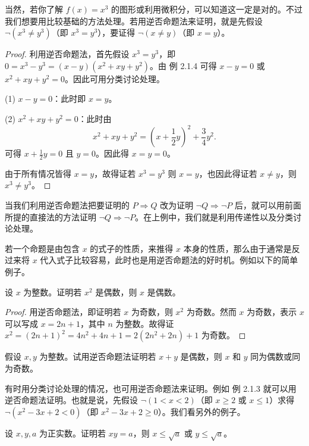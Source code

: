 当然，若你了解 $f(x) = x^3$ 的图形或利用微积分，可以知道这一定是对的。不过我们想要用比较基础的方法处理。若用逆否命题法来证明，就是先假设 $\neg (x^3 \neq y^3)$（即 $x^3 = y^3$），要证得 $\neg (x \neq y)$（即 $x = y$）。

\begin{proof}
利用逆否命题法，首先假设 $x^3 = y^3$，即 $0 = x^3 - y^3 = (x - y)(x^2 + xy + y^2)$。由 例 2.1.4 可得 $x - y = 0$ 或 $x^2 + xy + y^2 = 0$。因此可用分类讨论处理。

(1) $x - y = 0$：此时即 $x = y$。

(2) $x^2 + xy + y^2 = 0$：此时由
$$x^2 + xy + y^2 = (x + \frac{1}{2}y)^2 + \frac{3}{4}y^2.$$
可得 $x + \frac{1}{2} y = 0$ 且 $y = 0$。因此得 $x = y = 0$。

由于所有情况皆得 $x = y$，故得证若 $x^3 = y^3$ 则 $x = y$，也因此得证若 $x \neq y$，则 $x^3 \neq y^3$。
\end{proof}

当我们利用逆否命题法把要证明的 $P \Rightarrow Q$ 改为证明 $\neg Q \Rightarrow \neg P$ 后，就可以用前面所提的直接法的方法证明 $\neg Q \Rightarrow \neg P$。在上例中，我们就是利用传递性以及分类讨论处理。

若一个命题是由包含 $x$ 的式子的性质，来推得 $x$ 本身的性质，那么由于通常是反过来将 $x$ 代入式子比较容易，此时也是用逆否命题法的好时机。例如以下的简单例子。

\begin{example}
设 $x$ 为整数。证明若 $x^2$ 是偶数，则 $x$ 是偶数。
\end{example}

\begin{proof}
用逆否命题法，即证明若 $x$ 为奇数，则 $x^2$ 为奇数。然而 $x$ 为奇数，表示 $x$ 可以写成 $x = 2n + 1$，其中 $n$ 为整数。故得证 $x^2 = (2n + 1)^2 = 4n^2 + 4n + 1 = 2(2n^2 + 2n) + 1$ 为奇数。
\end{proof}

\begin{question}
假设 $x, y$ 为整数。试用逆否命题法证明若 $x + y$ 是偶数，则 $x$ 和 $y$ 同为偶数或同为奇数。
\end{question}

有时用分类讨论处理的情况，也可用逆否命题法来证明。例如 例 2.1.3 就可以用逆否命题法证明。也就是说，先假设 $\neg (1 < x < 2)$（即 $x \ge 2$ 或 $x \le 1$）求得 $\neg (x^2 - 3x + 2 < 0)$（即 $x^2 - 3x + 2 \ge 0$）。我们看另外的例子。

\begin{example}
设 $x, y, a$ 为正实数。证明若 $xy = a$，则 $x \le \sqrt{a}$ 或 $y \le \sqrt{a}$。
\end{example}

